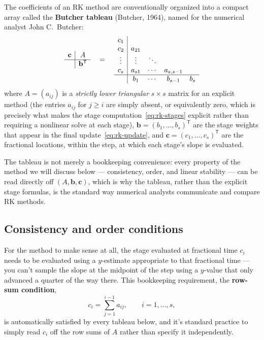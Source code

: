 The coefficients of an RK method are conventionally organized into a compact array called the \textbf{Butcher tableau} (Butcher, 1964), named for the numerical analyst John C.\ Butcher:
\begin{equation}
\begin{array}{c|c}
\mathbf{c} & A \\ \hline
 & \mathbf{b}^{\mathsf T}
\end{array}
\quad = \quad
\begin{array}{c|cccc}
c_1 & & & & \\
c_2 & a_{21} & & & \\
\vdots & \vdots & \ddots & & \\
c_s & a_{s1} & \cdots & a_{s,s-1} & \\ \hline
 & b_1 & \cdots & b_{s-1} & b_s
\end{array}
\end{equation}
where $A = (a_{ij})$ is a \emph{strictly lower triangular} $s\times s$ matrix for an explicit method (the entries $a_{ij}$ for $j \ge i$ are simply absent, or equivalently zero, which is precisely what makes the stage computation~\eqref{eq:rk-stages} explicit rather than requiring a nonlinear solve at each stage), $\mathbf{b} = (b_1,\dots,b_s)^{\mathsf T}$ are the stage weights that appear in the final update~\eqref{eq:rk-update}, and $\mathbf{c} = (c_1,\dots,c_s)^{\mathsf T}$ are the fractional locations, within the step, at which each stage's slope is evaluated.

The tableau is not merely a bookkeeping convenience: every property of the method we will discuss below --- consistency, order, and linear stability --- can be read directly off $(A, \mathbf b, \mathbf c)$, which is why the tableau, rather than the explicit stage formulas, is the standard way numerical analysts communicate and compare RK methods.

\subsection{Consistency and order conditions}

For the method to make sense at all, the stage evaluated at fractional time $c_i$ needs to be evaluated using a $y$-estimate appropriate to that fractional time --- you can't sample the slope at the midpoint of the step using a $y$-value that only advanced a quarter of the way there. This bookkeeping requirement, the \textbf{row-sum condition},
\begin{equation}
c_i = \sum_{j=1}^{i-1} a_{ij}, \qquad i = 1,\dots, s,
\label{eq:rowsum}
\end{equation}
is automatically satisfied by every tableau below, and it's standard practice to simply read $c_i$ off the row sums of $A$ rather than specify it independently.

